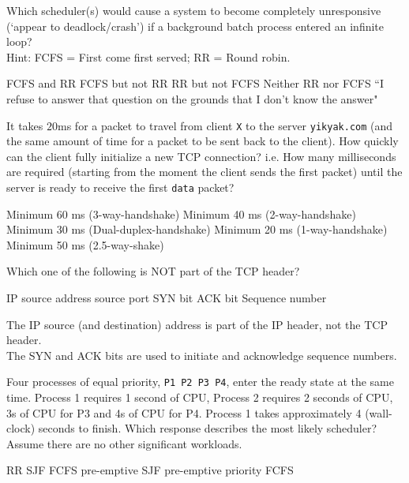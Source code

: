 \variant
Which scheduler(s) would cause a system to become completely unresponsive (`appear to deadlock/crash') if a background batch process entered an infinite loop?\\
Hint: FCFS = First come first served; RR = Round robin.
\begin{answers}
\answer FCFS and RR
\correctanswer FCFS but not RR
\answer RR but not FCFS
\answer Neither RR nor FCFS 
\answer ``I refuse to answer that question on the grounds that I don't know the answer" 
\end{answers}
\begin{solution}
\end{solution}

\variant
It takes $20$ms for a packet to travel from client {\tt X} to the server {\tt yikyak.com} (and the same amount of time for a packet to be sent back to the client). How quickly can the client fully initialize a new TCP connection? i.e. How many milliseconds are required (starting from the moment the client sends the first packet) until the server is ready to receive the first {\tt data} packet?

\begin{answers}
\correctanswer Minimum 60 ms (3-way-handshake)
\answer Minimum 40 ms (2-way-handshake)
\answer Minimum 30 ms (Dual-duplex-handshake)
\answer Minimum 20 ms (1-way-handshake)
\answer Minimum 50 ms (2.5-way-shake)
\end{answers}
\begin{solution}
\end{solution}

\variant
Which one of the following is NOT part of the TCP header?
\begin{answers}
\correctanswer IP source address
\answer source port
\answer SYN bit
\answer ACK bit
\answer Sequence number
\end{answers}
\begin{solution}
The IP source (and destination) address is part of the IP header, not the TCP header. \\
The SYN and ACK bits are used to initiate and acknowledge sequence numbers.\\
\end{solution}

\variant
Four processes of equal priority, {\tt P1 P2 P3 P4}, enter the ready state at the same time. Process 1 requires 1 second of CPU, Process 2 requires 2 seconds of CPU, 3s of CPU for P3 and 4s of CPU for P4. Process 1 takes approximately 4 (wall-clock) seconds to finish. Which response describes the most likely scheduler? Assume there are no other significant workloads.
\begin{answers}
\correctanswer RR
\answer SJF
\answer FCFS
\answer pre-emptive SJF
\answer pre-emptive priority FCFS
\end{answers}
\begin{solution}
\end{solution}



